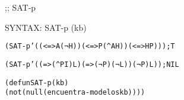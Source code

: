 \begin{aibox}{\function}
;; SAT-p

SYNTAX: SAT-p (kb)
\end{aibox}

\begin{aibox}{\examples}
\begin{alltt}
(SAT-p '((<=> A (¬ H)) (<=> P (^ A H)) (<=> H P))) ; T

(SAT-p '((=> (^ P I) L) (=> (¬ P) (¬ L)) (¬ P) L)) ; NIL
\end{alltt}

\end{aibox}

\begin{aibox}{\comments}

\end{aibox}
\begin{aibox}{\answers}

\end{aibox}
\begin{aibox}{\othercomments}

\end{aibox}
\begin{aibox}{\pseudocode}

\end{aibox}
\begin{aibox}{\code}

\begin{alltt}

(defun SAT-p (kb)
  (not (null (encuentra-modelos kb))))

\end{alltt}
\end{aibox}
